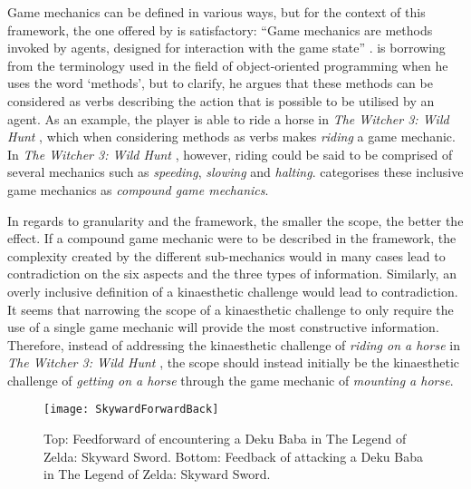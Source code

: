 Game mechanics can be defined in various ways, but for the context of this framework, the one offered by  is satisfactory: ``Game mechanics are methods invoked by agents, designed for interaction with the game state'' \cite{sicartmechanic}.  is borrowing from the terminology used in the field of object-oriented programming when he uses the word `methods', but to clarify, he argues that these methods can be considered as verbs describing the action that is possible to be utilised by an agent. As an example, the player is able to ride a horse in \textit{The Witcher 3: Wild Hunt} \cite{witcher}, which when considering methods as verbs makes \textit{riding} a game mechanic. In \textit{The Witcher 3: Wild Hunt} \cite{witcher}, however, riding could be said to be comprised of several mechanics such as \textit{speeding}, \textit{slowing} and \textit{halting}.  categorises these inclusive game mechanics as \textit{compound game mechanics}.

In regards to granularity and the framework, the smaller the scope, the better the effect. If a compound game mechanic were to be described in the framework, the complexity created by the different sub-mechanics would in many cases lead to contradiction on the six aspects and the three types of information. Similarly, an overly inclusive definition of a kinaesthetic challenge would lead to contradiction. It seems that narrowing the scope of a kinaesthetic challenge to only require the use of a single game mechanic will provide the most constructive information. Therefore, instead of addressing the kinaesthetic challenge of \textit{riding on a horse} in \textit{The Witcher 3: Wild Hunt} \cite{witcher}, the scope should instead initially be the kinaesthetic challenge of \textit{getting on a horse} through the game mechanic of \textit{mounting a horse}.

\begin{figure}[h]
  \texttt{[image: SkywardForwardBack]}
  \caption{Top: Feedforward of encountering a Deku Baba in The Legend of Zelda: Skyward Sword. Bottom: Feedback of attacking a Deku Baba in The Legend of Zelda: Skyward Sword.}
  \label{SkywardForwardBack}
\end{figure}

